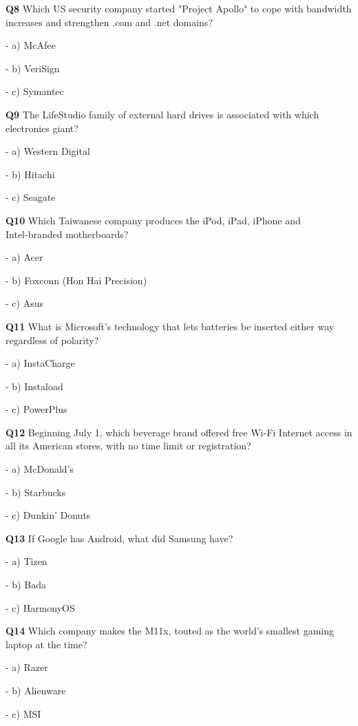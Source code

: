 \textbf{Q8} Which US security company started "Project Apollo" to cope with bandwidth increases and strengthen .com and .net domains?\par
\quad - a) McAfee\par
\quad - b) VeriSign\par
\quad - c) Symantec\par

\textbf{Q9} The LifeStudio family of external hard drives is associated with which electronics giant?\par
\quad - a) Western Digital\par
\quad - b) Hitachi\par
\quad - c) Seagate\par

\textbf{Q10} Which Taiwanese company produces the iPod, iPad, iPhone and Intel‑branded motherboards?\par
\quad - a) Acer\par
\quad - b) Foxconn (Hon Hai Precision)\par
\quad - c) Asus\par

\textbf{Q11} What is Microsoft's technology that lets batteries be inserted either way regardless of polarity?\par
\quad - a) InstaCharge\par
\quad - b) Instaload\par
\quad - c) PowerPlus\par

\textbf{Q12} Beginning July 1, which beverage brand offered free Wi‑Fi Internet access in all its American stores, with no time limit or registration?\par
\quad - a) McDonald's\par
\quad - b) Starbucks\par
\quad - c) Dunkin' Donuts\par

\textbf{Q13} If Google has Android, what did Samsung have?\par
\quad - a) Tizen\par
\quad - b) Bada\par
\quad - c) HarmonyOS\par

\textbf{Q14} Which company makes the M11x, touted as the world's smallest gaming laptop at the time?\par
\quad - a) Razer\par
\quad - b) Alienware\par
\quad - c) MSI\par

